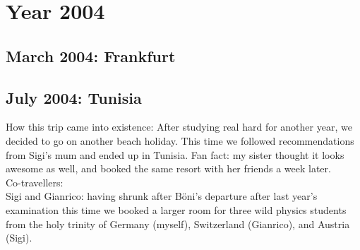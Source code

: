 \chapter{Year 2004}
\label{2004}

\section{March 2004: Frankfurt}
\label{2004:Frankfurt}

\section{July 2004: Tunisia}
\label{2004:Tunisia}

How this trip came into existence: After studying real hard for another year, we decided to go on another beach holiday. This time we followed recommendations from Sigi's mum and ended up in Tunisia. Fan fact: my sister thought it looks awesome as well, and booked the same resort with her friends a week later.\\

Co-travellers:\\
Sigi and Gianrico: having shrunk after B\"oni's departure after last year's examination this time we booked a larger room for three wild physics students from the holy trinity of Germany (myself), Switzerland (Gianrico), and Austria (Sigi).


